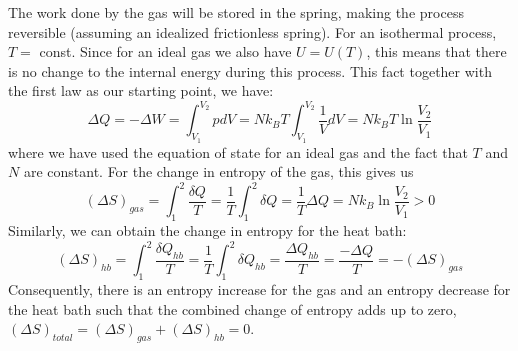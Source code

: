 \documentclass[12pt, a4paper, oneside, openright, titlepage]{book}
\begin{document}
\begin{center}
\end{center}

The work done by the gas will be stored in the spring, making the process reversible (assuming an idealized frictionless spring). For an isothermal process, $T = $ const. Since for an ideal gas we also have $U = U(T)$, this means that there is no change to the internal energy during this process. This fact together with the first law as our starting point, we have: $$\Delta Q = -\Delta W = \int_{V_1}^{V_2}pdV = Nk_BT\int_{V_1}^{V_2}\frac{1}{V}dV = Nk_BT\ln\frac{V_2}{V_1}$$
where we have used the equation of state for an ideal gas and the fact that $T$ and $N$ are constant. For the change in entropy of the gas, this gives us \begin{equation*}
    (\Delta S)_{gas} = \int_1^2\frac{\delta Q}{T} = \frac{1}{T}\int_1^2\delta Q = \frac{1}{T}\Delta Q = Nk_B\ln\frac{V_2}{V_1} > 0
\end{equation*}
Similarly, we can obtain the change in entropy for the heat bath: \begin{equation*}
    (\Delta S)_{hb} = \int_1^2\frac{\delta Q_{hb}}{T} = \frac{1}{T}\int_1^2\delta Q_{hb} = \frac{\Delta Q_{hb}}{T} = \frac{-\Delta Q}{T} = -(\Delta S)_{gas}
\end{equation*}
Consequently, there is an entropy increase for the gas and an entropy decrease for the heat bath such that the combined change of entropy adds up to zero, $(\Delta S)_{total} = (\Delta S)_{gas} + (\Delta S)_{hb} = 0$.
\end{document}
